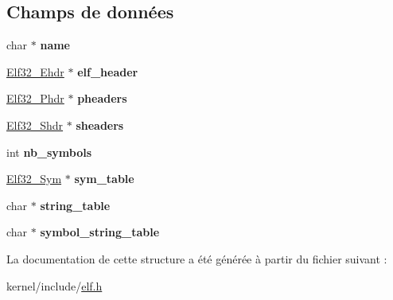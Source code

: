 \subsection*{Champs de données}
\begin{DoxyCompactItemize}
\item 
\hypertarget{structElf32__File_ad72bb34e9388d51790c6059cdd122137}{char $\ast$ {\bfseries name}}\label{structElf32__File_ad72bb34e9388d51790c6059cdd122137}

\item 
\hypertarget{structElf32__File_ac8df03922d25955e8e597c061a5e228e}{\hyperlink{structElf32__Ehdr}{Elf32\-\_\-\-Ehdr} $\ast$ {\bfseries elf\-\_\-header}}\label{structElf32__File_ac8df03922d25955e8e597c061a5e228e}

\item 
\hypertarget{structElf32__File_a6ff1304dbfdc29691fc0756faeebf2b1}{\hyperlink{structElf32__Phdr}{Elf32\-\_\-\-Phdr} $\ast$ {\bfseries pheaders}}\label{structElf32__File_a6ff1304dbfdc29691fc0756faeebf2b1}

\item 
\hypertarget{structElf32__File_aa62b3fae81faacc3ede185f4ada96d65}{\hyperlink{structElf32__Shdr}{Elf32\-\_\-\-Shdr} $\ast$ {\bfseries sheaders}}\label{structElf32__File_aa62b3fae81faacc3ede185f4ada96d65}

\item 
\hypertarget{structElf32__File_a153a673f289468d35118dae8299d96aa}{int {\bfseries nb\-\_\-symbols}}\label{structElf32__File_a153a673f289468d35118dae8299d96aa}

\item 
\hypertarget{structElf32__File_a9fb4df42bf3b43251eb3657d4acc7a71}{\hyperlink{structElf32__Sym}{Elf32\-\_\-\-Sym} $\ast$ {\bfseries sym\-\_\-table}}\label{structElf32__File_a9fb4df42bf3b43251eb3657d4acc7a71}

\item 
\hypertarget{structElf32__File_a0b326fa5b82dc0d378b5c28608796ae6}{char $\ast$ {\bfseries string\-\_\-table}}\label{structElf32__File_a0b326fa5b82dc0d378b5c28608796ae6}

\item 
\hypertarget{structElf32__File_abe6e60d88f24c924a8bf536f4d76d724}{char $\ast$ {\bfseries symbol\-\_\-string\-\_\-table}}\label{structElf32__File_abe6e60d88f24c924a8bf536f4d76d724}

\end{DoxyCompactItemize}


La documentation de cette structure a été générée à partir du fichier suivant \-:\begin{DoxyCompactItemize}
\item 
kernel/include/\hyperlink{elf_8h}{elf.\-h}\end{DoxyCompactItemize}
